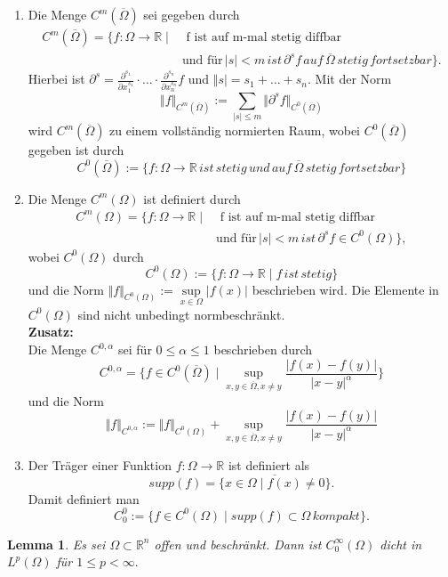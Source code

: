 \documentclass[12pt,titlepage]{article}
\newtheorem{lemma}[zahl]{Lemma}
\numberwithin{equation}{section}
\begin{document}
\begin{enumerate}
\item Die Menge $C^m (\overline{\Omega})$ sei gegeben durch \begin{align*} C^m(\overline{\Omega})=\{f:\Omega\to \mathbb{R}\mid &\text{ f ist auf m-mal stetig diffbar }\\
& \text{und für} \, \vert s \vert < m \, ist \,{\partial}^s f\, auf \,
  \overline{\Omega}\, stetig \, fortsetzbar\}.
\end{align*}  
Hierbei ist $\partial^s=\frac{\partial^{s_1}}{\partial x_1^{s_1}}\cdot \ldots \cdot \frac{\partial^{s_n}}{\partial x_n^{s_n}}f $ und $ \Vert s \vert =s_1+\ldots+ s_n.$ Mit der Norm 
\[
\Vert f \Vert_{C^m(\overline{\Omega})}:=\sum_{\vert s \vert \leq m }\Vert \partial^s f \Vert_{C^0(\overline{\Omega})}
\] wird $C^m (\overline{\Omega})$ zu einem vollständig normierten Raum, wobei $C^0 (\overline{\Omega})$ gegeben ist durch 
\[
C^0 (\overline{\Omega}):=\{f:\Omega \to \mathbb{R}\, ist \, stetig \, und \,auf \, \overline{\Omega}\, stetig \,fortsetzbar\}
\]
  \item Die Menge $C^m(\Omega)$ ist definiert durch\begin{align*}
  C^m(\Omega)=\{f:\Omega\to \mathbb{R}\mid &\text{ f ist auf m-mal stetig diffbar }\\
& \text{und für} \, \vert s \vert < m \, ist \,{\partial}^s f\in C^0(\Omega)\},
\end{align*}  wobei $C^0(\Omega)$ durch 
\[
C^0(\Omega):=\{f:\Omega \to \mathbb{R}\mid f \, ist \, stetig\}
\] und die Norm $\Vert f \Vert_{C^0(\Omega)}:= \underset{x\in \Omega}{\sup}\vert f(x)\vert $ beschrieben wird. Die Elemente in $C^0(\Omega)$ sind nicht unbedingt normbeschränkt.\\
\textbf{Zusatz:}\\
Die Menge $C^{0,\alpha}$ sei für $0\leq \alpha \leq 1$ beschrieben durch 
\[C^{0,\alpha}=\{f\in C^0(\overline{\Omega})\mid \underset{x,y\in \overline{\Omega},x\neq y}{\sup}\frac{\vert f(x)-f(y)\vert}{\vert x-y \vert^{\alpha}}\}
\] und die Norm 
\[
\Vert f \Vert_{C^{0,\alpha}}:=\Vert f \Vert_{C^0(\Omega)}+\underset{x,y\in\overline{\Omega},x\neq y}{\sup}\frac{\vert f(x)-f(y)\vert}{\vert x-y \vert^{\alpha}}
\]
\item Der Träger einer Funktion $f:\Omega\to \mathbb{R}$ ist definiert als 
\[
supp(f)=\overline{\{x \in \Omega \mid f(x) \neq 0\}}.
\] Damit definiert man 
\[
C^0_0:=\{f\in C^0(\Omega)\mid supp(f) \subset \Omega \, kompakt\}.
\]
\end{enumerate}
\begin{lemma}
Es sei $ \Omega \subset \mathbb{R}^n $ offen und beschränkt. Dann ist $C^{\infty}_0(\Omega)$ dicht in $L^p(\Omega) $ für $1\leq p < \infty.$
\end{lemma}
\end{document}
